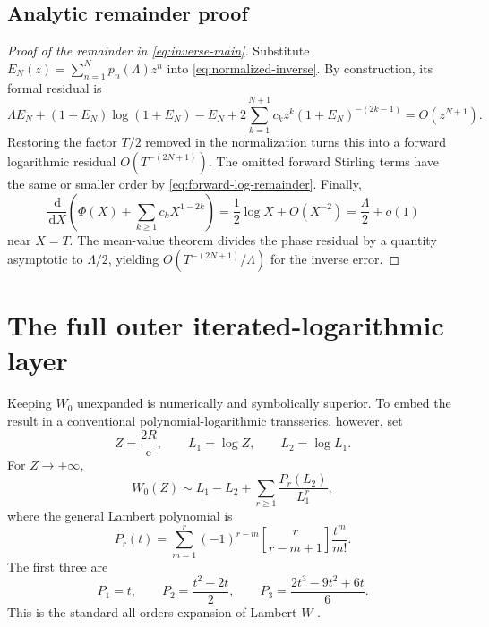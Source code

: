 \documentclass[11pt,oneside]{article}
\theoremstyle{plain}
\theoremstyle{definition}
\theoremstyle{remark}
\newcommand{\e}{\mathrm e}
\newcommand{\dd}{\,\mathrm d}
\newcommand{\stirlingone}[2]{\genfrac{[}{]}{0pt}{}{#1}{#2}}
\begin{document}
\subsection{Analytic remainder proof}
\label{sec:inverse-remainder}

\begin{proof}[Proof of the remainder in \cref{eq:inverse-main}]
Substitute
\(
 E_N(z)=\sum_{n=1}^Np_n(\Lambda)z^n
\)
into \cref{eq:normalized-inverse}.  By construction, its formal residual is
\begin{equation}
 \Lambda E_N+(1+E_N)\log(1+E_N)-E_N
 +2\sum_{k=1}^{N+1}c_kz^k(1+E_N)^{-(2k-1)}
 =O(z^{N+1}).
 \label{eq:formal-residual}
\end{equation}
Restoring the factor \(T/2\) removed in the normalization turns this into a
forward logarithmic residual \(O(T^{-(2N+1)})\).  The omitted forward Stirling
terms have the same or smaller order by
\cref{eq:forward-log-remainder}.  Finally,
\begin{equation}
 \frac{\dd}{\dd X}\left(
 \Phi(X)+\sum_{k\ge1}c_kX^{1-2k}\right)
 =\frac12\log X+O(X^{-2})
 =\frac\Lambda2+o(1)
 \label{eq:inverse-slope}
\end{equation}
near \(X=T\).  The mean-value theorem divides the phase residual by a quantity
asymptotic to \(\Lambda/2\), yielding
\(O(T^{-(2N+1)}/\Lambda)\) for the inverse error.
\end{proof}

\section{The full outer iterated-logarithmic layer}
\label{sec:outer-logs}

Keeping \(W_0\) unexpanded is numerically and symbolically superior.  To embed
the result in a conventional polynomial-logarithmic transseries, however, set
\begin{equation}
 Z=\frac{2R}{\e},
 \qquad L_1=\log Z,
 \qquad L_2=\log L_1.
 \label{eq:L1L2}
\end{equation}
For \(Z\to+\infty\),
\begin{equation}
 W_0(Z)\sim L_1-L_2+\sum_{r\ge1}\frac{P_r(L_2)}{L_1^r},
 \label{eq:W-expansion}
\end{equation}
where the general Lambert polynomial is
\begin{equation}
 \boxed{
 P_r(t)=\sum_{m=1}^{r}
 (-1)^{r-m}\stirlingone{r}{r-m+1}\frac{t^m}{m!}.}
 \label{eq:Lambert-polynomial}
\end{equation}
The first three are
\begin{equation}
 P_1=t,
 \qquad P_2=\frac{t^2-2t}{2},
 \qquad P_3=\frac{2t^3-9t^2+6t}{6}.
 \label{eq:first-Lambert-polys}
\end{equation}
This is the standard all-orders expansion of Lambert \(W\)
\cite{CorlessEtAl,DLMF413}.
\end{document}

